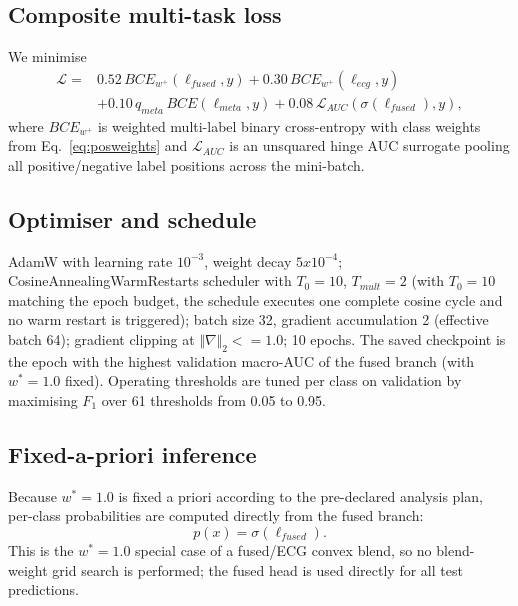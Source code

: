 \documentclass[mathematics,article,submit,pdftex]{Definitions/mdpi}
\def\mathrm#1{#1}%
\def\mathbf#1{#1}%
\def\emph#1{#1}%
\def\bm#1{#1}%
\def\times{x}%
\def\leq{<=}%
\begin{document}
\subsection{Composite multi-task loss}
We minimise
\begin{equation}
\begin{aligned}
\mathcal{L}={}&0.52\,\mathrm{BCE}_{\mathbf{w}^{+}}\!(\bm{\ell}_{\mathrm{fused}},\mathbf{y})
 +0.30\,\mathrm{BCE}_{\mathbf{w}^{+}}\!(\bm{\ell}_{\mathrm{ecg}},\mathbf{y})\\
&+0.10\,q_{\mathrm{meta}}\,\mathrm{BCE}\!(\bm{\ell}_{\mathrm{meta}},\mathbf{y})
 +0.08\,\mathcal{L}_{\mathrm{AUC}}\!(\sigma(\bm{\ell}_{\mathrm{fused}}),\mathbf{y}),
\end{aligned}
\end{equation}
where $\mathrm{BCE}_{\mathbf{w}^{+}}$ is weighted multi-label binary cross-entropy with class weights from Eq.~\eqref{eq:posweights} and $\mathcal{L}_{\mathrm{AUC}}$ is an unsquared hinge AUC surrogate pooling all positive/negative label positions across the mini-batch.

\subsection{Optimiser and schedule}
AdamW with learning rate $10^{-3}$, weight decay $5{\times}10^{-4}$; CosineAnnealingWarmRestarts scheduler with $T_0{=}10$, $T_{\mathrm{mult}}{=}2$ (with $T_0{=}10$ matching the epoch budget, the schedule executes one complete cosine cycle and no warm restart is triggered); batch size 32, gradient accumulation 2 (effective batch 64); gradient clipping at $\Vert\nabla\Vert_{2}{\leq}1.0$; 10 epochs. The saved checkpoint is the epoch with the highest validation macro-AUC of the fused branch (with $w^{\ast}{=}1.0$ fixed). Operating thresholds are tuned per class on validation by maximising $F_{1}$ over 61 thresholds from 0.05 to 0.95.

\subsection{Fixed-a-priori inference}
Because $w^{\ast}{=}1.0$ is fixed \emph{a priori} according to the pre-declared analysis plan, per-class probabilities are computed directly from the fused branch:
\begin{equation}
\mathbf{p}(\mathbf{x}) = \sigma(\bm{\ell}_{\mathrm{fused}}).
\end{equation}
This is the $w^{\ast}{=}1.0$ special case of a fused/ECG convex blend, so no blend-weight grid search is performed; the fused head is used directly for all test predictions.
\end{document}
